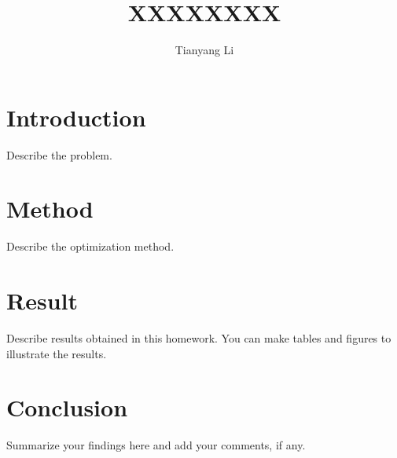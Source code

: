 \documentclass{article}
\title{XXXXXXXX}
\author{Tianyang Li}
\begin{document}
\maketitle

\section{Introduction}

Describe the problem.

\section{Method}

Describe the optimization method.

\section{Result}

Describe results obtained in this homework. You can make
tables and figures to illustrate the results.


\section{Conclusion}

Summarize your findings here and add your comments, if any.
\end{document}
